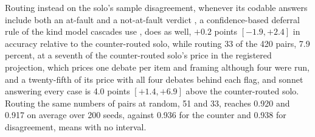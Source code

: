 Routing instead on
the solo's sample disagreement, whenever its codable answers include both an
at-fault and a not-at-fault verdict
\citep{wang2023selfconsistency,manakul2023selfcheck}, a confidence-based
deferral rule of the kind model cascades use
\citep{jitkrittum2023deferral,gupta2024cascades,yue2024cascades},
does as well, $+0.2$ points $[-1.9, +2.4]$ in accuracy relative to the
counter-routed solo, while routing 33 of the 420 pairs, 7.9 percent, at a
seventh of the counter-routed solo's price in the registered projection,
which prices one debate per item and framing although four were run, and a
twenty-fifth of its price with all four debates behind each flag, and sonnet
answering every case is 4.0 points $[+1.4, +6.9]$ above the counter-routed
solo.
Routing the same numbers of pairs at random, 51 and 33, reaches 0.920 and
0.917 on average over 200 seeds, against 0.936 for the counter and 0.938 for
disagreement, means with no interval.
